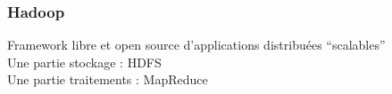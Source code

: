 \begin{frame}
  \frametitle{Hadoop}
  Framework libre et open source d'applications distribuées ``scalables'' \\
  Une partie stockage : HDFS \\
  Une partie traitements : MapReduce
\end{frame}

